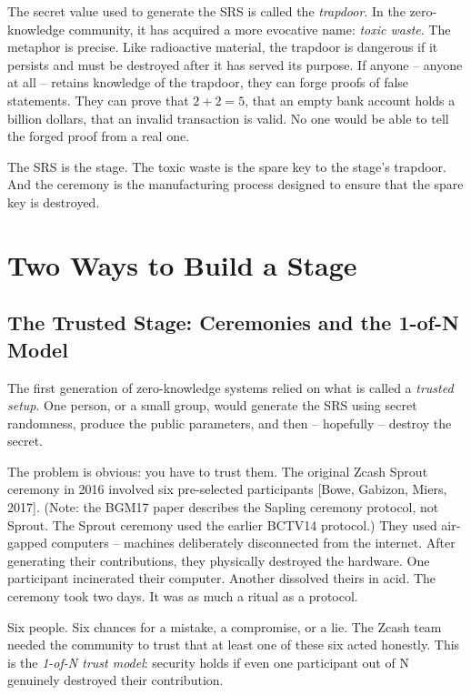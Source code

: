 \documentclass[
  11pt,
  openany]{report}
\begin{document}
The secret value used to generate the SRS is called the \emph{trapdoor}. In the
zero-knowledge community, it has acquired a more evocative name: \emph{toxic
waste}. The metaphor is precise. Like radioactive material, the trapdoor is
dangerous if it persists and must be destroyed after it has served its purpose.
If anyone -- anyone at all -- retains knowledge of the trapdoor, they can forge
proofs of false statements. They can prove that \(2 + 2 = 5\), that an empty
bank account holds a billion dollars, that an invalid transaction is valid. No
one would be able to tell the forged proof from a real one.

The SRS is the stage. The toxic waste is the spare key to the stage's trapdoor.
And the ceremony is the manufacturing process designed to ensure that the spare
key is destroyed.

\section{Two Ways to Build a Stage}\label{two-ways-to-build-a-stage}

\subsection{The Trusted Stage: Ceremonies and the 1-of-N
Model}\label{the-trusted-stage-ceremonies-and-the-1-of-n-model}

The first generation of zero-knowledge systems relied on what is called a
\emph{trusted setup}. One person, or a small group, would generate the SRS using
secret randomness, produce the public parameters, and then -- hopefully --
destroy the secret.

The problem is obvious: you have to trust them. The original Zcash Sprout
ceremony in 2016 involved six pre-selected participants {[}Bowe, Gabizon, Miers,
2017{]}. (Note: the BGM17 paper describes the Sapling ceremony protocol, not
Sprout. The Sprout ceremony used the earlier BCTV14 protocol.) They used
air-gapped computers -- machines deliberately disconnected from the internet.
After generating their contributions, they physically destroyed the hardware.
One participant incinerated their computer. Another dissolved theirs in acid.
The ceremony took two days. It was as much a ritual as a protocol.

Six people. Six chances for a mistake, a compromise, or a lie. The Zcash team
needed the community to trust that at least one of these six acted honestly.
This is the \emph{1-of-N trust model}: security holds if even one participant
out of N genuinely destroyed their contribution.
\end{document}
